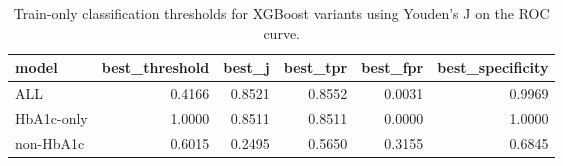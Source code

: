 \begin{table}[H]
\begin{center}
\begin{tabular}{lrrrrr}
\toprule
model & best_threshold & best_j & best_tpr & best_fpr & best_specificity \\
\midrule
ALL & 0.4166 & 0.8521 & 0.8552 & 0.0031 & 0.9969 \\
HbA1c-only & 1.0000 & 0.8511 & 0.8511 & 0.0000 & 1.0000 \\
non-HbA1c & 0.6015 & 0.2495 & 0.5650 & 0.3155 & 0.6845 \\
\bottomrule
\end{tabular}
\end{center}
\vspace{-5pt}
\caption{Train-only classification thresholds for XGBoost variants using Youden's J on the ROC curve.}
\label{tab:xgb_thresholds_youden_train}
\end{table}
